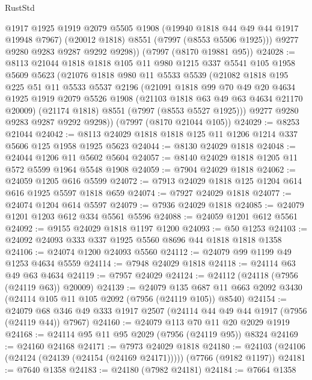 \begin{lexlean}{RustStd}
\begin{coremodule}
{\begin{coremodule}
{{{{{{{{{{{{{{{{{{{{{{{{{{{{{{{{{{{{{{{{{{{          @1917
          @1925
          @1919
          @2079
          @5505
          @1908
          (@19940 @1818 @44 @49 @44 @1917 @19948 @7967)
          (@20012 @1818)
          @8551
          (@7997 (@8553 @5506 @1925)))
        @9277
        @9280
        @9283
        @9287
        @9292
        @9298))
    (@7997 (@8170 @19881 @95))
@24028 := @8113
    @21044
    @1818
    @1818
    @105
    @11
    @980
    @1215
    @337
    @5541
    @105
    @1958
    @5609
    @5623
    (@21076
      @1818
      @980
      @11
      @5533
      @5539
      (@21082
        @1818
        @195
        @225
        @51
        @11
        @5533
        @5537
        @2196
        (@21091
          @1818
          @99
          @70
          @49
          @20
          @4634
          @1925
          @1919
          @2079
          @5526
          @1908
          (@21103 @1818 @63 @49 @63 @4634 @21170 @20009)
          (@21174 @1818)
          @8551
          (@7997 (@8553 @5527 @1925)))
        @9277
        @9280
        @9283
        @9287
        @9292
        @9298))
    (@7997 (@8170 @21044 @105))
@24029 := @8253 @21044
@24042 := @8113 @24029 @1818 @1818 @125 @11 @1206 @1214 @337 @5606 @125 @1958 @1925 @5623
@24044 := @8130 @24029 @1818
@24048 := @24044 @1206 @11 @5602 @5604
@24057 := @8140 @24029 @1818 @1205 @11 @572 @5599 @1964 @5548 @1908
@24059 := @7904 @24029 @1818
@24062 := @24059 @1205 @616 @5599
@24072 := @7913 @24029 @1818 @125 @1204 @614 @616 @1925 @5597 @1818 @659
@24074 := @7927 @24029 @1818
@24077 := @24074 @1204 @614 @5597
@24079 := @7936 @24029 @1818
@24085 := @24079 @1201 @1203 @612 @334 @5561 @5596
@24088 := @24059 @1201 @612 @5561
@24092 := @9155 @24029 @1818 @1197 @1200
@24093 := @50 @1253
@24103 := @24092 @24093 @333 @337 @1925 @5560 @8696 @44 @1818 @1818 @1358
@24106 := @24074 @1200 @24093 @5560
@24112 := @24079 @99 @1199 @49 @1253 @4634 @5559
@24114 := @7948 @24029 @1818
@24118 := @24114 @63 @49 @63 @4634
@24119 := @7957 @24029
@24124 := @24112 (@24118 (@7956 (@24119 @63)) @20009)
@24139 := @24079
    @135
    @687
    @11
    @663
    @2092
    @3430
    (@24114 @105 @11 @105 @2092 (@7956 (@24119 @105)) @8540)
@24154 := @24079 @68 @346 @49 @333 @1917 @2507 (@24114 @44 @49 @44 @1917 (@7956 (@24119 @44)) @7967)
@24160 := @24079 @113 @70 @11 @20 @2029 @1919
@24168 := @24114 @95 @11 @95 @2029 (@7956 (@24119 @95)) @8324
@24169 := @24160 @24168
@24171 := @7973 @24029 @1818
@24180 := @24103 (@24106 (@24124 (@24139 (@24154 (@24169 @24171))))) (@7766 (@9182 @1197))
@24181 := @7640 @1358
@24183 := @24180 (@7982 @24181)
@24184 := @7664 @1358
}}}}}}}}}}}}}}}}}}}}}}}}}}}}}}}}}}}}}}}}}}}
\end{coremodule}}
\end{coremodule}
\end{lexlean}
